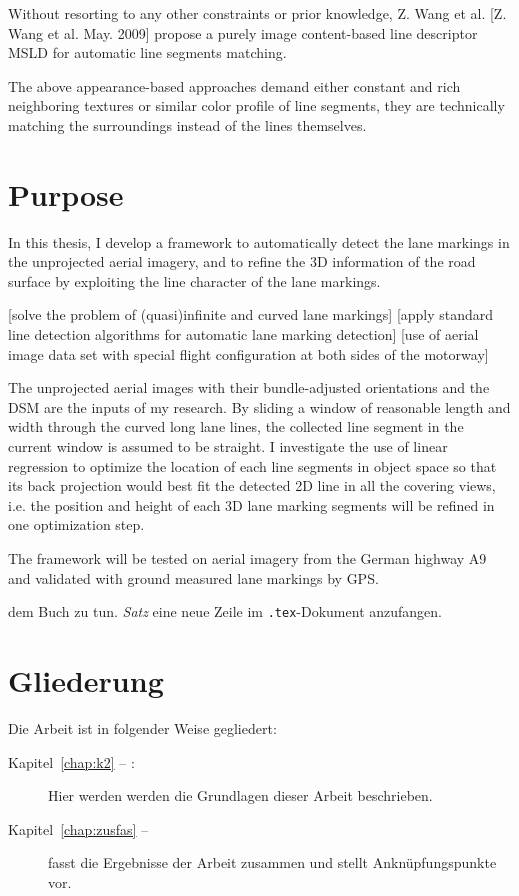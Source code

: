Without resorting to any other constraints or prior knowledge, Z. Wang et al. [Z. Wang et al. May. 2009] propose a purely image content-based line descriptor MSLD for automatic line segments matching. 

The above appearance-based approaches demand either constant and rich neighboring textures or similar color profile of line segments, they are technically matching the surroundings instead of the lines themselves.




\section{Purpose}

In this thesis, I develop a framework to automatically detect the lane markings in the unprojected aerial imagery, and to refine the 3D information of the road surface by exploiting the line character of the lane markings.

[solve the problem of (quasi)infinite and curved lane markings]
[apply standard line detection algorithms for automatic lane marking detection]
[use of aerial image data set with special flight configuration at both sides of the motorway]

The unprojected aerial images with their bundle-adjusted orientations and the DSM are the inputs of my research. By sliding a window of reasonable length and width through the curved long lane lines, the collected line segment in the current window is assumed to be straight. I investigate the use of linear regression to optimize the location of each line segments in object space so that its back projection would best fit the detected 2D line in all the covering views, i.e. the position and height of each 3D lane marking segments will be refined in one optimization step.

The framework will be tested on aerial imagery from the German highway A9 and validated with ground measured lane markings by GPS.


 dem Buch \cite{WSPA} zu tun.
\emph{Satz} eine neue Zeile im \texttt{.tex}-Dokument anzufangen.


\section*{Gliederung}
Die Arbeit ist in folgender Weise gegliedert:
\begin{description}
\item[Kapitel~\ref{chap:k2} -- :] Hier werden werden die Grundlagen dieser Arbeit beschrieben.
\item[Kapitel~\ref{chap:zusfas} -- ] fasst die Ergebnisse der Arbeit zusammen und stellt Anknüpfungspunkte vor.
\end{description}
